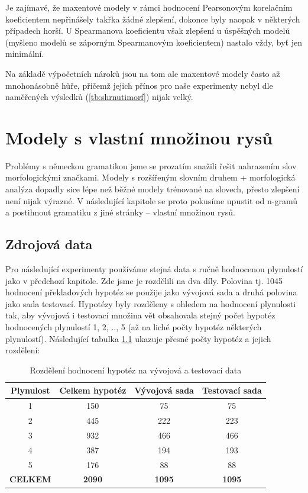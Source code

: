 \documentclass[12pt,a4paper]{report}
\begin{document}
Je zajímavé, že maxentové modely v rámci hodnocení Pearsonovým korelačním koeficientem nepřinášely takřka žádné zlepšení, dokonce byly naopak v některých případech horší. U Spearmanova koeficientu však zlepšení u úspěšných modelů (myšleno modelů se záporným Spearmanovým koeficientem) nastalo vždy, byť jen minimální.

Na základě výpočetních nároků jsou na tom ale maxentové modely často až mnohonásobně hůře, přičemž jejich přínos pro naše experimenty nebyl dle naměřených výsledků (\ref{tb:shrnutimorf}) nijak velký.


\chapter{Modely s vlastní množinou rysů}
Problémy s německou gramatikou jsme se prozatím snažili řešit nahrazením slov morfologickými značkami. Modely s rozšířeným slovním druhem + morfologická analýza dopadly sice lépe než běžné modely trénované na slovech, přesto zlepšení není nijak výrazné. V následující kapitole se proto pokusíme upustit od n-gramů a postihnout gramatiku z jiné stránky -- vlastní množinou rysů.

\section{Zdrojová data}

Pro následující experimenty používáme stejná data s ručně hodnocenou plynulostí jako v předchozí kapitole. Zde jsme je rozdělili na dva díly. Polovina tj. 1045 hodnocení překladových hypotéz se použije jako vývojová sada a druhá polovina jako sada testovací. Hypotézy byly rozděleny s ohledem na hodnocení plynulosti tak, aby vývojová i testovací množina vět obsahovala stejný počet hypotéz hodnocených plynulostí 1, 2, .., 5 (až na liché počty hypotéz některých plynulostí). Následující tabulka \ref{tb:rozdeleni} ukazuje přesné počty hypotéz a jejich rozdělení:

\begin{table}[!htbp]
\begin{center}\begin{tabular}{|c|c|c|c|}
	\hline
	\textbf{Plynulost} & \textbf{Celkem hypotéz} & \textbf{Vývojová sada} & \textbf{Testovací sada}\\
	\hline
	1 & 150 & 75 & 75\\
	\hline
	2 & 445 & 222 & 223\\
	\hline
	3 & 932 & 466 & 466\\
	\hline
	4 & 387 & 194 & 193\\
	\hline
	5 & 176 & 88 & 88\\
	\hline
	\hline	
	\multicolumn{1}{c}{\textbf{CELKEM}} & \multicolumn{1}{c}{\textbf{2090}} & \multicolumn{1}{c}{\textbf{1095}} & \multicolumn{1}{c}{\textbf{1095}}\\
\end{tabular}
\caption{Rozdělení hodnocení hypotéz na vývojová a testovací data}\label{tb:rozdeleni}
\end{center}\end{table}
\end{document}
